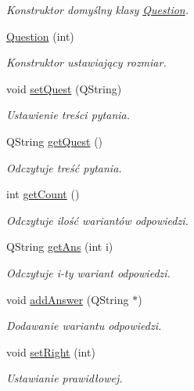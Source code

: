 \begin{DoxyCompactItemize}
\begin{DoxyCompactList}\small\item\em \-Konstruktor domyślny klasy \hyperlink{classQuestion}{\-Question}. \end{DoxyCompactList}\item 
\hyperlink{classQuestion_a3d0520fe99796920613b7c4ecd488c11}{\-Question} (int)
\begin{DoxyCompactList}\small\item\em \-Konstruktor ustawiający rozmiar. \end{DoxyCompactList}\item 
void \hyperlink{classQuestion_ad492cdcbebcec385405b958a7b0fc7b4}{set\-Quest} (\-Q\-String)
\begin{DoxyCompactList}\small\item\em \-Ustawienie treści pytania. \end{DoxyCompactList}\item 
\-Q\-String \hyperlink{classQuestion_ab6e80c0dc5bd15bec210d8937e0d9f68}{get\-Quest} ()
\begin{DoxyCompactList}\small\item\em \-Odczytuje treść pytania. \end{DoxyCompactList}\item 
int \hyperlink{classQuestion_a3dea4f0f7cb72d5d0c5fe7223ee947ab}{get\-Count} ()
\begin{DoxyCompactList}\small\item\em \-Odczytuje ilość wariantów odpowiedzi. \end{DoxyCompactList}\item 
\-Q\-String \hyperlink{classQuestion_a2e039ab1e76677f4edbdd9a523de01f4}{get\-Ans} (int i)
\begin{DoxyCompactList}\small\item\em \-Odczytuje i-\/ty wariant odpowiedzi. \end{DoxyCompactList}\item 
void \hyperlink{classQuestion_a0b94754c2244fe6c7c62db56d5395e97}{add\-Answer} (\-Q\-String $\ast$)
\begin{DoxyCompactList}\small\item\em \-Dodawanie wariantu odpowiedzi. \end{DoxyCompactList}\item 
void \hyperlink{classQuestion_af3aed20396e45a671a068fdb9ffe6998}{set\-Right} (int)
\begin{DoxyCompactList}\small\item\em \-Ustawianie prawidłowej. \end{DoxyCompactList}\end{DoxyCompactItemize}
